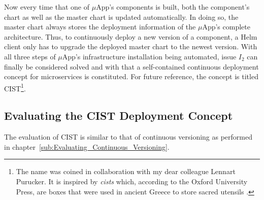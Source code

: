 Now every time that one of $\mu$App's components is built, both the component's
chart as well as the master chart is updated automatically. In doing so, the
master chart always stores the deployment information of the $\mu$App's
complete architecture. Thus, to continuously deploy a new version of a
component, a Helm client only has to upgrade the deployed master chart to the
newest version. With all three steps of $\mu$App's infrastructure installation
being automated, issue $I_2$ can finally be considered solved and with that a
self-contained continuous deployment concept for microservices is constituted.
For future reference, the concept is titled \ac{CIST}\footnote{The name was
coined in collaboration with my dear colleague Lennart Purucker. It is inspired
by \textit{cists} which, according to the Oxford University Press, are boxes
that were used in ancient Greece to store sacred utensils
\autocite{Presscist}.}.

\subsection{Evaluating the \acf{CIST} Deployment Concept}%
\label{sub:Evaluating_the_CIST_Deployment_Concept}

The evaluation of \ac{CIST} is similar to that of continuous versioning as
performed in chapter~\ref{sub:Evaluating_Continuous_Versioning}.

